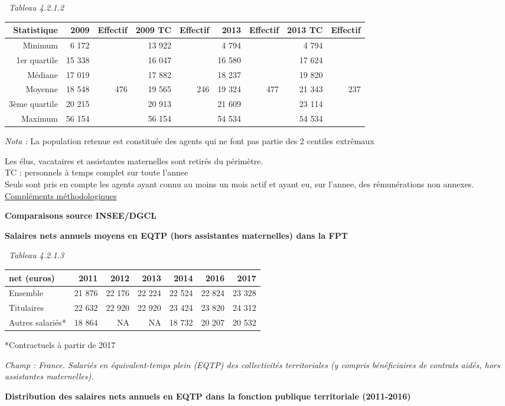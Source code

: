 ~\emph{Tableau 4.2.1.2}

\begin{longtable}[]{@{}rrrrrrrrr@{}}
\toprule
Statistique & 2009 & Effectif & 2009 TC & Effectif & 2013 & Effectif &
2013 TC & Effectif\tabularnewline
\midrule
\endhead
Minimum & 6 172 & & 13 922 & & 4 794 & & 4 794 &\tabularnewline
1er quartile & 15 338 & & 16 047 & & 16 580 & & 17 624 &\tabularnewline
Médiane & 17 019 & & 17 882 & & 18 237 & & 19 820 &\tabularnewline
Moyenne & 18 548 & 476 & 19 565 & 246 & 19 324 & 477 & 21 343 &
237\tabularnewline
3ème quartile & 20 215 & & 20 913 & & 21 609 & & 23 114 &\tabularnewline
Maximum & 56 154 & & 56 154 & & 54 534 & & 54 534 &\tabularnewline
\bottomrule
\end{longtable}

\emph{Nota :} La population retenue est constituée des agents qui ne
font pas partie des 2 centiles extrêmaux

Les élus, vacataires et assistantes maternelles sont retirés du
périmètre.\\
TC : personnels à temps complet sur toute l'annee\\
Seuls sont pris en compte les agents ayant connu au moins un mois actif
et ayant eu, sur l'annee, des rémunérations non annexes.\\
\href{../Docs/méthodologie.pdf}{Compléments méthodologiques}

\textbf{Comparaisons source INSEE/DGCL}

\textbf{Salaires nets annuels moyens en EQTP (hors assistantes
maternelles) dans la FPT}

~\emph{Tableau 4.2.1.3}

\begin{longtable}[]{@{}lrrrrrr@{}}
\toprule
net (euros) & 2011 & 2012 & 2013 & 2014 & 2016 & 2017\tabularnewline
\midrule
\endhead
Ensemble & 21 876 & 22 176 & 22 224 & 22 524 & 22 824 & 23
328\tabularnewline
Titulaires & 22 632 & 22 920 & 22 920 & 23 424 & 23 820 & 24
312\tabularnewline
Autres salariés* & 18 864 & NA & NA & 18 732 & 20 207 & 20
532\tabularnewline
\bottomrule
\end{longtable}

*Contractuels à partir de 2017

\emph{Champ : France. Salariés en équivalent-temps plein (EQTP) des
collectivités territoriales (y compris bénéficiaires de contrats aidés,
hors assistantes maternelles).}

\textbf{Distribution des salaires nets annuels en EQTP dans la fonction
publique territoriale (2011-2016)}

